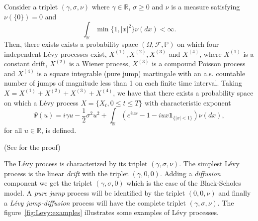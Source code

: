 \begin{thm}
Consider a triplet $(\gamma,\sigma,\nu)$ where $\gamma\in\mathbb{R}$, $\sigma\geq 0$ and $\nu$ is a measure satisfying $\nu(\{0\}) = 0$ and
$$\int_\mathbb{R} \min\{1,|x|^2\}\nu(dx)<\infty.$$
Then, there exists exists a probability space $(\Omega,\mathcal{F},\mathbb{P})$ on which four independent L\'evy processes exist, $X^{(1)},X^{(2)},X^{(3)}$ and $X^{(4)}$, where $X^{(1)}$ is a constant drift, $X^{(2)}$ is a Wiener process, $X^{(3)}$ is a compound Poisson process and $X^{(4)}$ is a square integrable (pure jump) martingale with an a.s. countable number of jumps of magnitude less than 1 on each finite time interval. Taking $X = X^{(1)}+X^{(2)}+X^{(3)}+X^{(4)}$, we have that there exists a probability space on which a L\'evy process $X = \{X_t,0\leq t \leq T\}$ with characteristic exponent
$$\Psi(u) = i\gamma u -\frac{1}{2}\sigma^2u^2+\int_\mathbb{R}\left(e^{iux}-1-iux\mathbf{1}_{\{|x|<1\}}\right)\nu(dx),$$
for all $u\in\mathbb{R}$, is defined.

(See \citeauthor{Kyp06} \citeyearpar{Kyp06} for the proof)
\end{thm}

The L\'evy process is characterized by its triplet $(\gamma,\sigma,\nu)$. The simplest L\'evy process is the linear \textit{drift} with the triplet $(\gamma,0,0)$. Adding a \textit{diffusion} component we get the triplet $(\gamma,\sigma,0)$ which is the case of the Black-Scholes model. A \textit{pure jump} process will be identified by the triplet $(0,0,\nu)$ and finally a \textit{L\'evy jump-diffusion} process will have the complete triplet $(\gamma,\sigma,\nu)$. The figure~\ref{fig:Levy:examples} illustrates some examples of L\'evy processes.

